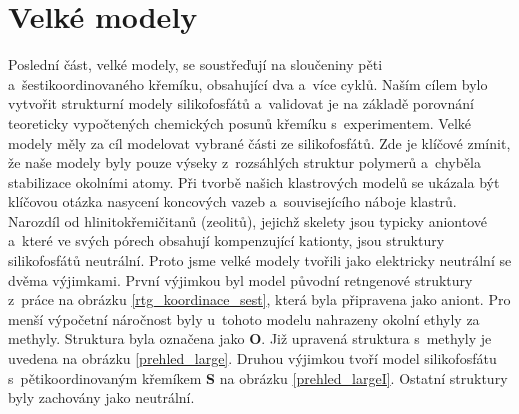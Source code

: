 \documentclass[
digital, %
table,   %
nolof,     %
nolot,     %
oneside,
]{fithesis3}
\begin{document}
\section{Velké modely}
Poslední část, velké modely, se soustřeďují na sloučeniny pěti a~šestikoordinovaného křemíku, obsahující dva a~více cyklů. Naším cílem bylo vytvořit strukturní modely silikofosfátů a~validovat je na základě porovnání teoreticky vypočtených chemických posunů křemíku s~experimentem. Velké modely měly za cíl modelovat vybrané části ze silikofosfátů. Zde je klíčové zmínit, že naše modely byly pouze výseky z~rozsáhlých struktur polymerů a~chyběla stabilizace okolními atomy. Při tvorbě našich klastrových modelů se ukázala být klíčovou otázka nasycení koncových vazeb a~souvisejícího náboje klastrů. Narozdíl od hlinitokřemičitanů (zeolitů), jejichž skelety jsou typicky aniontové a~které ve svých pórech obsahují kompenzující kationty, jsou struktury silikofosfátů neutrální. Proto jsme velké modely tvořili jako elektricky neutrální se dvěma výjimkami. První výjimkou byl model původní retngenové struktury z~práce \cite{C3NJ00721A} na obrázku \ref{rtg_koordinace_sest}, která byla připravena jako aniont. Pro menší výpočetní náročnost byly u~tohoto modelu nahrazeny okolní ethyly za methyly. Struktura byla označena jako \textbf{O}. Již upravená struktura s~methyly je uvedena na obrázku \ref{prehled_large}. Druhou výjimkou tvoří model silikofosfátu s~pětikoordinovaným křemíkem \textbf{S} na obrázku \ref{prehled_largeI}. Ostatní struktury byly zachovány jako neutrální.
\end{document}
